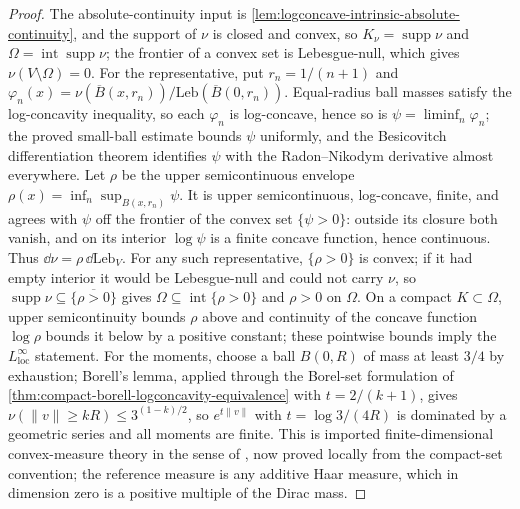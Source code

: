 \begin{proof}
  \leanok
  The absolute-continuity input is \cref{lem:logconcave-intrinsic-absolute-continuity}, and the
  support of $\nu$ is closed and convex, so $K_\nu=\operatorname{supp}\nu$ and
  $\Omega=\operatorname{int}\operatorname{supp}\nu$; the frontier of a convex set is Lebesgue-null,
  which gives $\nu(V\setminus\Omega)=0$.  For the representative, put $r_n=1/(n+1)$ and
  $\varphi_n(x)=\nu(\overline B(x,r_n))/\mathrm{Leb}(\overline B(0,r_n))$.  Equal-radius ball masses
  satisfy the log-concavity inequality, so each $\varphi_n$ is log-concave, hence so is
  $\psi=\liminf_n\varphi_n$; the proved small-ball estimate bounds $\psi$ uniformly, and the
  Besicovitch differentiation theorem identifies $\psi$ with the Radon--Nikodym derivative
  almost everywhere.  Let $\rho$ be the upper semicontinuous envelope
  $\rho(x)=\inf_n\sup_{B(x,r_n)}\psi$.  It is upper semicontinuous, log-concave, finite, and
  agrees with $\psi$ off the frontier of the convex set $\{\psi>0\}$: outside its closure both
  vanish, and on its interior $\log\psi$ is a finite concave function, hence continuous.  Thus
  $\dd\nu=\rho\,\dd\mathrm{Leb}_V$.  For any such representative, $\{\rho>0\}$ is convex; if it
  had empty interior it would be Lebesgue-null and could not carry $\nu$, so
  $\operatorname{supp}\nu\subseteq\overline{\{\rho>0\}}$ gives
  $\Omega\subseteq\operatorname{int}\{\rho>0\}$ and $\rho>0$ on $\Omega$.  On a compact
  $K\subset\Omega$, upper semicontinuity bounds $\rho$ above and continuity of the concave
  function $\log\rho$ bounds it below by a positive constant; these pointwise bounds imply the
  $L^\infty_{\mathrm{loc}}$ statement.  For the moments, choose a ball $B(0,R)$ of mass at least
  $3/4$ by exhaustion; Borell's lemma, applied through the Borel-set formulation of
  \cref{thm:compact-borell-logconcavity-equivalence} with $t=2/(k+1)$, gives
  $\nu(\|v\|\ge kR)\le 3^{(1-k)/2}$, so $e^{t\|v\|}$ with $t=\log 3/(4R)$ is dominated by a
  geometric series and all moments are finite.  This is imported finite-dimensional
  convex-measure theory in the sense of \cite{Borell1974Convex}, now proved locally from the
  compact-set convention; the reference measure is any additive Haar measure, which in dimension
  zero is a positive multiple of the Dirac mass.
\end{proof}

